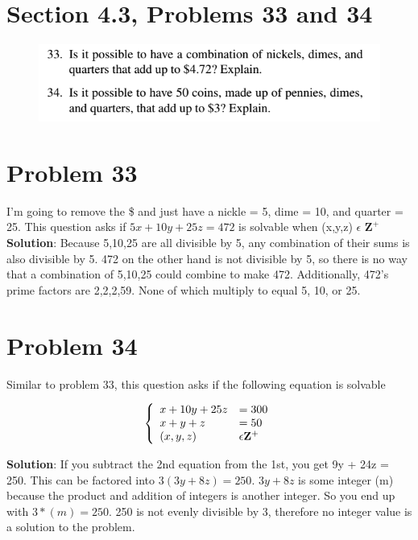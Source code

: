 \documentclass{article}
\author{Spencer Lawry}
\begin{document}
\section*{Section 4.3, Problems 33 and 34}
\begin{figure}[h]
\includegraphics[scale=0.9]{HW2Prob1}
\centering
\end{figure}
\begin{large}
\section*{Problem 33}
I'm going to remove the \$ and just have a nickle = 5, dime = 10, and quarter = 25. \newline
This question asks if $5x + 10y + 25z = 472$ is solvable when (x,y,z) $\epsilon$ $\mathbf{Z}^+$
\newline\newline 
\textbf{Solution}: Because 5,10,25 are all divisible by 5, any combination of their sums is also divisible by 5. 472 on the
other hand is not divisible by 5, so there is no way that a combination of 5,10,25 could combine to make 472. 
\newline \newline 
Additionally, 472's prime factors are 2,2,2,59. None of which multiply to equal 5, 10, or 25.

\section*{Problem 34}
Similar to problem 33, this question asks if the following equation is solvable

\begin{align}
\left\{ \begin{array}{ll}
x + 10y + 25z &= 300\\
x + y + z &= 50\\
(x,y,z) &\epsilon \mathbf{Z}^+
\end{array}\right.
\end{align}


\textbf{Solution}: If you subtract the 2nd equation from the 1st, you get 9y + 24z = 250. \newline
This can be factored into $3(3y+8z)=250$. $3y+8z$ is some integer (m) because the product and addition of integers is another integer.
So you end up with $3*(m) = 250$. 250 is not evenly divisible by 3, therefore no integer value is a solution to the problem. 


\end{large}
\end{document}
